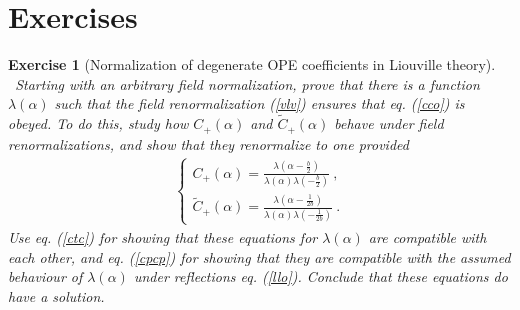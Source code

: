 \documentclass[12pt,a4paper,notitlepage]{report}
\newcommand \bla {\left\{\begin{array}{l} }
\newcommand \ela {\end{array}\right. }
\numberwithin{equation}{section}
\theoremstyle{break}
\newtheorem{exo}{Exercise}[chapter]
\begin{document}
\section{Exercises}

\begin{exo}[Normalization of degenerate OPE coefficients in Liouville theory]
 ~\label{exonorm}
Starting with an arbitrary field normalization, prove that there is a function $\lambda(\alpha)$ such that the field renormalization (\ref{vlv}) ensures that eq. (\ref{cco}) is obeyed. To do this, study how $C_+(\alpha)$ and $\tilde{C}_+(\alpha)$ behave under field renormalizations, and show that they renormalize to one provided
\begin{align}
\bla
 C_+(\alpha) = \frac{\lambda(\alpha-\frac{b}{2})}{\lambda(\alpha)\lambda(-\frac{b}{2})} \ ,
\\
\tilde{C}_+(\alpha) = \frac{\lambda(\alpha-\frac{1}{2b})}{\lambda(\alpha)\lambda(-\frac{1}{2b})} \ .
\ela
\end{align}
Use eq. (\ref{ctc}) for showing that these equations for $\lambda(\alpha)$ are compatible with each other, and eq. (\ref{cpcp}) for showing that they are compatible with the  assumed behaviour of $\lambda(\alpha)$ under reflections eq. (\ref{llo}). Conclude that these equations do have a solution.
\end{exo}
\end{document}
